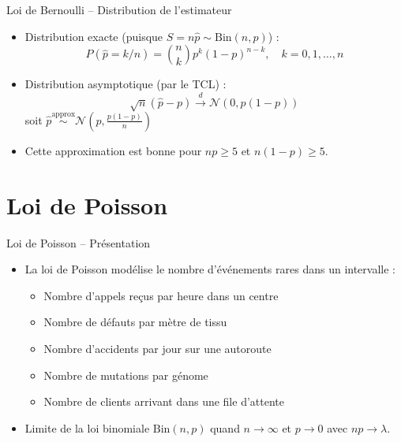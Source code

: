 \documentclass[11pt,aspectratio=169]{beamer}
\begin{document}
\begin{frame}{Loi de Bernoulli -- Distribution de l'estimateur}

\begin{itemize}

\item Distribution exacte (puisque $S = n\hat{p} \sim \text{Bin}(n, p)$) :
  \[
  P(\hat{p} = k/n) = \binom{n}{k} p^k (1-p)^{n-k}, \quad k = 0, 1, \ldots, n
  \]

\item Distribution asymptotique (par le TCL) :
  \[
  \sqrt{n}(\hat{p} - p) \xrightarrow{d} \mathcal{N}(0, p(1-p))
  \]
  soit $\hat{p} \overset{\text{approx}}{\sim} \mathcal{N}\left(p, \frac{p(1-p)}{n}\right)$\newline

\item Cette approximation est bonne pour $np \geq 5$ et $n(1-p) \geq 5$.

\end{itemize}

\end{frame}

\section{Loi de Poisson}

\begin{frame}{Loi de Poisson -- Présentation}

\begin{itemize}

\item La loi de Poisson modélise le nombre d'événements rares dans un intervalle :\newline
  \begin{itemize}
    \item Nombre d'appels reçus par heure dans un centre\newline
    \item Nombre de défauts par mètre de tissu\newline
    \item Nombre d'accidents par jour sur une autoroute\newline
    \item Nombre de mutations par génome\newline
    \item Nombre de clients arrivant dans une file d'attente\newline
  \end{itemize}

\item Limite de la loi binomiale $\text{Bin}(n, p)$ quand $n \to \infty$ et $p \to 0$ avec $np \to \lambda$.

\end{itemize}

\end{frame}
\end{document}
